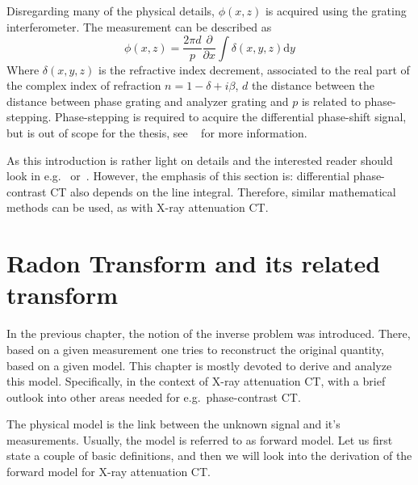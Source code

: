 Disregarding many of the physical details, \(\phi(x, z)\) is acquired using the grating
interferometer. The measurement can be described as
\[ \phi(x, z) = \frac{2\pi d}{p} \frac{\partial}{\partial x}\int \delta(x, y, z)\mathrm{d}y\]
Where \(\delta (x, y, z)\) is the refractive index decrement, associated to the real part of the
complex index of refraction \(n = 1 − \delta + i\beta\), \(d\) the distance between the distance
between phase grating and analyzer grating and \(p\) is related to phase-stepping. Phase-stepping is
required to acquire the differential phase-shift signal, but is out of scope for the thesis, see
~\cite{weitkamp_x-ray_2005} for more information.

As this introduction is rather light on details and the interested reader should look in
e.g.\ \cite{teuffenbach_grating-based_2017} or~\cite{hahn_statistical_2014}. However, the emphasis
of this section is: differential phase-contrast CT also depends on the line integral. Therefore,
similar mathematical methods can be used, as with X-ray attenuation CT\@.


%
%

\chapter{Radon Transform and its related transform}\label{chap:radon_transform_and_related}

In the previous chapter, the notion of the inverse problem was introduced. There, based on a given
measurement one tries to reconstruct the original quantity, based on a given model. This chapter is
mostly devoted to derive and analyze this model. Specifically, in the context of X-ray attenuation
CT, with a brief outlook into other areas needed for e.g.\ phase-contrast CT\@.

The physical model is the link between the unknown signal and it's measurements. Usually, the model
is referred to as forward model. Let us first state a couple of basic definitions, and then we will
look into the derivation of the forward model for X-ray attenuation CT\@.

